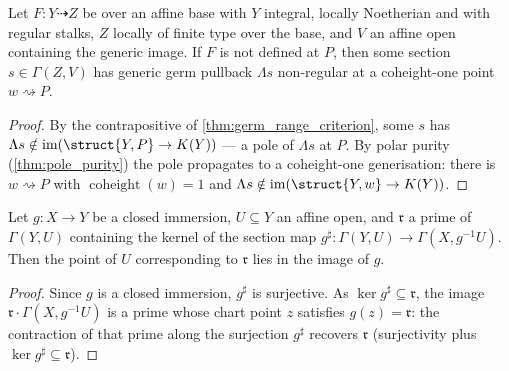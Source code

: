 \begin{theorem}
  \label{thm:pole_existence}
  \leanok
  Let \(F : Y \dashrightarrow Z\) be over an affine base with \(Y\) integral,
  locally Noetherian and with regular stalks, \(Z\) locally of finite type over
  the base, and \(V\) an affine open containing the generic image. If \(F\) is
  not defined at \(P\), then some section \(s \in \Gamma(Z, V)\) has generic germ
  pullback \(\Lambda s\) non-regular at a coheight-one point \(w \rightsquigarrow
  P\).
\end{theorem}
\begin{proof}
  \leanok
  By the contrapositive of \ref{thm:germ_range_criterion}, some \(s\) has
  \(\Lambda s \notin \operatorname{im}(\struct{Y,P} \to K(Y))\) --- a pole of
  \(\Lambda s\) at \(P\). By polar purity (\ref{thm:pole_purity}) the pole
  propagates to a coheight-one generisation: there is \(w \rightsquigarrow P\)
  with \(\operatorname{coheight}(w) = 1\) and \(\Lambda s \notin
  \operatorname{im}(\struct{Y,w} \to K(Y))\).
\end{proof}

\begin{lemma}
  \label{lem:chart_image_point}
  \leanok
  Let \(g : X \to Y\) be a closed immersion, \(U \subseteq Y\) an affine open,
  and \(\mathfrak r\) a prime of \(\Gamma(Y, U)\) containing the kernel of the
  section map \(g^\sharp : \Gamma(Y, U) \to \Gamma(X, g^{-1}U)\). Then the point
  of \(U\) corresponding to \(\mathfrak r\) lies in the image of \(g\).
\end{lemma}
\begin{proof}
  \leanok
  Since \(g\) is a closed immersion, \(g^\sharp\) is surjective. As
  \(\ker g^\sharp \subseteq \mathfrak r\), the image \(\mathfrak r \cdot
  \Gamma(X, g^{-1}U)\) is a prime whose chart point \(z\) satisfies \(g(z) =
  \mathfrak r\): the contraction of that prime along the surjection \(g^\sharp\)
  recovers \(\mathfrak r\) (surjectivity plus \(\ker g^\sharp \subseteq
  \mathfrak r\)).
\end{proof}

